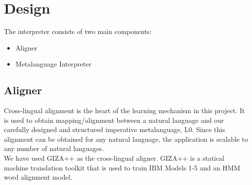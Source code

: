 \def\DevnagVersion{2.15}\documentclass[12pt]{article}
\begin{document}
% 
% 
% 
% 

\section{Design}
The interpreter consists of two main components:
\begin{itemize}
\item Aligner
\item Metalanguage Interpreter
\end{itemize}

\subsection{Aligner}
Cross-lingual alignment is the heart of the learning mechanism in this project. It is used to obtain mapping/alignment between a natural language and our carefully designed and structured imperative metalanguage, L0. Since this alignment can be obtained for any natural language, the application is scalable to any number of natural languages.\\

We have used GIZA++ \cite{och2003systematic} as the cross-lingual aligner. GIZA++ is a statical machine translation toolkit that is used to train IBM Models 1-5 and an HMM word alignment model.\\
\end{document}
